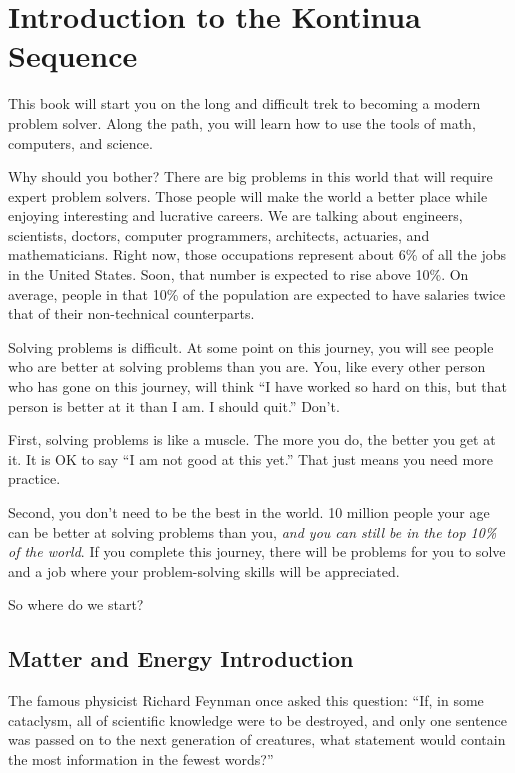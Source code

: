 \chapter{Introduction to the Kontinua Sequence}

This book will start you on the long and difficult trek to becoming a modern
problem solver. Along the path, you will learn how to use the tools of
math, computers, and science. 

Why should you bother? There are big problems in this world that will
require expert problem solvers. Those people will make the world a
better place while enjoying interesting and lucrative careers. We are
talking about engineers, scientists, doctors, computer programmers,
architects, actuaries, and mathematicians. Right now, those occupations represent
about 6\% of all the jobs in the United States. Soon,
that number is expected to rise above 10\%.  On average, people in
that 10\% of the population are expected to have salaries twice that
of their non-technical counterparts.

Solving problems is difficult. At some point on this journey, you will
see people who are better at solving problems than you are. You, like
every other person who has gone on this journey, will think ``I have
worked so hard on this, but that person is better at it than
I am. I should quit.'' Don't.

First, solving problems is like a muscle. The more you do, the better
you get at it.  It is OK to say ``I am not good at this yet.'' That
just means you need more practice.

Second, you don't need to be the best in the world. 10 million people
your age can be better at solving problems than you, \textit{and you
  can still be in the top 10\% of the world}. If you complete this
journey, there will be problems for you to solve and a job where your
problem-solving skills will be appreciated.

So where do we start?

\section{Matter and Energy Introduction}

The famous physicist Richard Feynman once asked this question: ``If,
in some cataclysm, all of scientific knowledge were to be destroyed,
and only one sentence was passed on to the next generation of
creatures, what statement would contain the most information in the
fewest words?''

